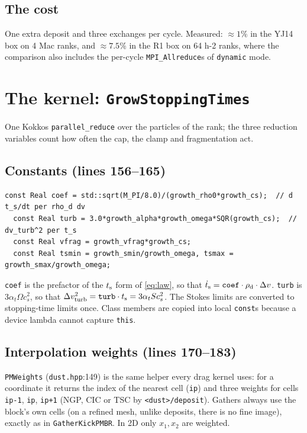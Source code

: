 \documentclass[11pt]{article}
\newcommand{\code}[1]{\texttt{#1}}
\newcommand{\file}[1]{\texttt{\small #1}}
\newcommand{\fn}[1]{\texttt{\small #1}}
\newcommand{\St}{S}
\newcommand{\ts}{t_{\rm s}}
\newcommand{\rhod}{\rho_{\rm d}}
\begin{document}
\subsection{The cost}
One extra deposit and three exchanges per cycle. Measured: $\approx1\%$ in the YJ14 box
on 4 Mac ranks, and $\approx7.5\%$ in the R1 box on 64 h-2 ranks, where the comparison
also includes the per-cycle \code{MPI\_Allreduce}s of \code{dynamic} mode.

\section{The kernel: \fn{GrowStoppingTimes}}\label{sec:kernel}
One Kokkos \code{parallel\_reduce} over the particles of the rank; the three reduction
variables count how often the cap, the clamp and fragmentation act.

\subsection{Constants (lines 156--165)}
\begin{lstlisting}[firstnumber=156]
  const Real coef = std::sqrt(M_PI/8.0)/(growth_rho0*growth_cs);  // d t_s/dt per rho_d dv
  const Real turb = 3.0*growth_alpha*growth_omega*SQR(growth_cs);  // dv_turb^2 per t_s
  const Real vfrag = growth_vfrag*growth_cs;
  const Real tsmin = growth_smin/growth_omega, tsmax = growth_smax/growth_omega;
\end{lstlisting}
\code{coef} is the prefactor of the $\ts$ form of \eqref{eq:law}, so that
$\dot\ts=\code{coef}\cdot\rhod\cdot\Delta v$. \code{turb} is $3\alpha_t\Omega c_s^2$, so
that $\Delta v_{\rm turb}^2=\code{turb}\cdot\ts=3\alpha_t\St c_s^2$. The Stokes limits
are converted to stopping-time limits once. Class members are copied into local
\code{const}s because a device lambda cannot capture \code{this}.

\subsection{Interpolation weights (lines 170--183)}
\fn{PMWeights} (\file{dust.hpp}:149) is the same helper every drag kernel uses: for a
coordinate it returns the index of the nearest cell (\code{ip}) and three weights for
cells \code{ip-1}, \code{ip}, \code{ip+1} (NGP, CIC or TSC by \code{<dust>/deposit}).
Gathers always use the block's own cells (on a refined mesh, unlike deposits, there is
no fine image), exactly as in \fn{GatherKickPMBR}. In 2D only $x_1,x_2$ are weighted.
\end{document}
